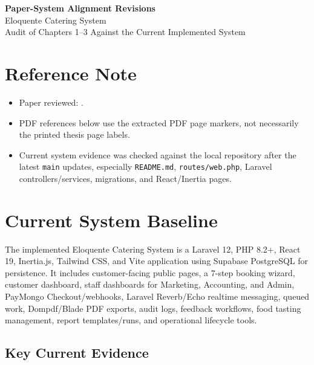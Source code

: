 \documentclass[11pt]{article}
\begin{document}
\begin{center}
    {\Large\bfseries Paper-System Alignment Revisions}\\[0.35em]
    {\large Eloquente Catering System}\\[0.5em]
    {\color{darkgray}Audit of Chapters 1--3 Against the Current Implemented System}
\end{center}

\vspace{0.75em}

\section*{Reference Note}

\begin{itemize}
    \item Paper reviewed: .
    \item PDF references below use the extracted PDF page markers, not necessarily the printed thesis page labels.
    \item Current system evidence was checked against the local repository after the latest \texttt{main} updates, especially \texttt{README.md}, \texttt{routes/web.php}, Laravel controllers/services, migrations, and React/Inertia pages.
\end{itemize}

\section*{Current System Baseline}

The implemented Eloquente Catering System is a Laravel 12, PHP 8.2+, React 19, Inertia.js, Tailwind CSS, and Vite application using Supabase PostgreSQL for persistence. It includes customer-facing public pages, a 7-step booking wizard, customer dashboard, staff dashboards for Marketing, Accounting, and Admin, PayMongo Checkout/webhooks, Laravel Reverb/Echo realtime messaging, queued work, Dompdf/Blade PDF exports, audit logs, feedback workflows, food tasting management, report templates/runs, and operational lifecycle tools.

\subsection*{Key Current Evidence}
\end{document}
